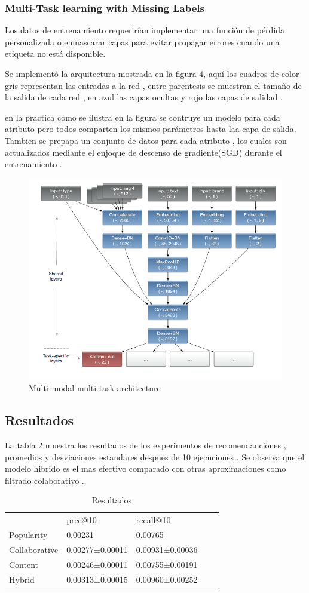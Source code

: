 \documentclass[conference]{IEEEtran}
\begin{document}
\subsubsection{Multi-Task learning with Missing Labels}
Los datos de entrenamiento requerirían implementar una función de pérdida personalizada o enmascarar capas para evitar propagar errores cuando una etiqueta no está disponible.

Se implementó la arquitectura mostrada en la figura 4, aquí los cuadros de color gris representan las entradas a la red  , entre parentesis se muestran el tamaño de la salida de cada red , en azul las capas ocultas y rojo las capas de salidad .  

en la practica como se ilustra en la figura se contruye un modelo para cada atributo pero todos comparten los mismos parámetros hasta laa capa de salida. Tambien se prepapa un conjunto de datos para cada atributo , los cuales son actualizados mediante el enjoque de descenso de gradiente(SGD) durante el entrenamiento . 
\begin{figure}
\centerline{\includegraphics[width=\textwidth,width=9cm]{figura4.png}}
\caption{Multi-modal multi-task architecture}
\label{fig}
\end{figure}

\subsection{Resultados}


La tabla 2 muestra los resultados de los experimentos de recomendanciones , promedios y desviaciones estandares despues de 10 ejecuciones . Se observa que el modelo hibrido es el mas efectivo comparado con otras aproximaciones como filtrado colaborativo .



\begin{table}[]
\centering
\caption{Resultados}
\begin{tabular}{lllll}
		 & prec@10  & recall@10\\
Popularity        & 0.00231 & 0.00765\\
Collaborative        & 0.00277±0.00011& 0.00931±0.00036 \\
Content        & 0.00246±0.00011 & 0.00755±0.00191\\
Hybrid    & 0.00313±0.00015   & 0.00960±0.00252 
\end{tabular}
\end{table}
\end{document}
